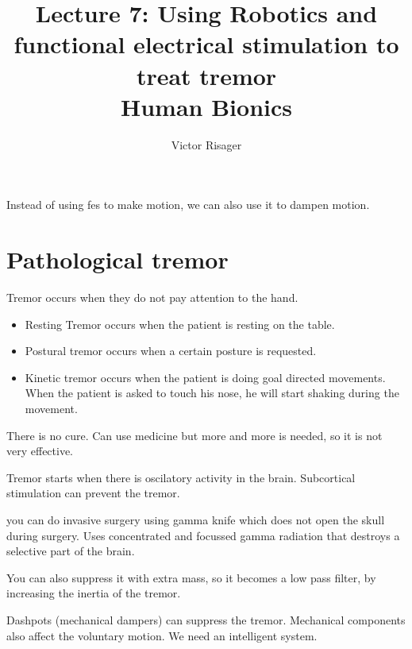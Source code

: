 \documentclass[a4paper]{article}
\title{Lecture 7: Using Robotics and functional electrical stimulation to treat tremor  \\
	\large Human Bionics}
\author{Victor Risager}
\begin{document}
\maketitle

Instead of using fes to make motion, we can also use it to dampen motion.

\section{Pathological tremor}
Tremor occurs when they do not pay attention to the hand. 
\begin{itemize}
	\item Resting Tremor occurs when the patient is resting on the table. 
	\item Postural tremor occurs when a certain posture is requested. 
	\item Kinetic tremor occurs when the patient is doing goal directed movements. When the patient is asked to touch his nose, he will start shaking during the movement. 
\end{itemize}

There is no cure. Can use medicine but more and more is needed, so it is not very effective. 

Tremor starts when there is oscilatory activity in the brain. Subcortical stimulation can prevent the tremor. 


you can do invasive surgery using gamma knife which does not open the skull during surgery. Uses concentrated and focussed gamma radiation that destroys a selective part of the brain.   

You can also suppress it with extra mass, so it becomes a low pass filter, by increasing the inertia of the tremor. 

Dashpots (mechanical dampers) can suppress the tremor. 
Mechanical components also affect the voluntary motion. We need an intelligent system. 
\end{document}
